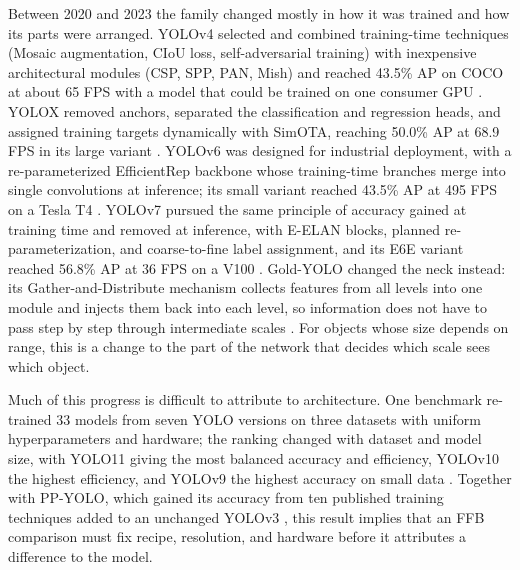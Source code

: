 Between 2020 and 2023 the family changed mostly in how it was trained and how its parts were arranged. YOLOv4 selected and combined training-time techniques (Mosaic augmentation, CIoU loss, self-adversarial training) with inexpensive architectural modules (CSP, SPP, PAN, Mish) and reached 43.5\% AP on COCO at about 65 FPS with a model that could be trained on one consumer GPU \cite{bochkovskiy2020yolov4}. YOLOX removed anchors, separated the classification and regression heads, and assigned training targets dynamically with SimOTA, reaching 50.0\% AP at 68.9 FPS in its large variant \cite{ge2021yolox}. YOLOv6 was designed for industrial deployment, with a re-parameterized EfficientRep backbone whose training-time branches merge into single convolutions at inference; its small variant reached 43.5\% AP at 495 FPS on a Tesla T4 \cite{li2022yolov6}. YOLOv7 pursued the same principle of accuracy gained at training time and removed at inference, with E-ELAN blocks, planned re-parameterization, and coarse-to-fine label assignment, and its E6E variant reached 56.8\% AP at 36 FPS on a V100 \cite{wang2023yolov7}. Gold-YOLO changed the neck instead: its Gather-and-Distribute mechanism collects features from all levels into one module and injects them back into each level, so information does not have to pass step by step through intermediate scales \cite{wang2023goldyolo}. For objects whose size depends on range, this is a change to the part of the network that decides which scale sees which object.

Much of this progress is difficult to attribute to architecture. One benchmark re-trained 33 models from seven YOLO versions on three datasets with uniform hyperparameters and hardware; the ranking changed with dataset and model size, with YOLO11 giving the most balanced accuracy and efficiency, YOLOv10 the highest efficiency, and YOLOv9 the highest accuracy on small data \cite{alif2024yoloevolution}. Together with PP-YOLO, which gained its accuracy from ten published training techniques added to an unchanged YOLOv3 \cite{long2020ppyolo}, this result implies that an FFB comparison must fix recipe, resolution, and hardware before it attributes a difference to the model.

